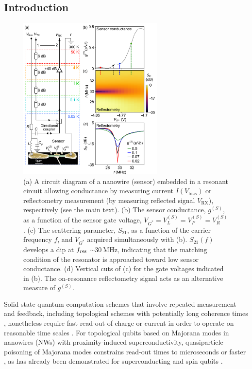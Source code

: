 \subsection{Introduction}

\begin{figure}
	\includegraphics[width=0.65\textwidth]{Fig1-20.pdf}
	\caption[The rf charge-sensing setup]{(a) A circuit diagram of a nanowire (sensor) embedded in a resonant circuit allowing conductance by measuring current $I(V_\textrm{bias})$ or reflectometry measurement (by measuring reflected signal $V_\textrm{RX}$), respectively (see the main text). (b) The sensor conductance, $g^{(S)}$, as a function of the sensor gate voltage, $V_{G^{*}} = V_{L}^{(S)} = V_{P}^{(S)} = V_{R}^{(S)}$. (c) The scattering parameter, $S_{21}$, as a function of the carrier frequency $f$, and $V_{G^{*}}$ acquired simultaneously with (b). $S_{21}(f)$ develops a dip at $f_{\rm res}$ $\sim \SI{30}{\mega\hertz}$, indicating that the matching condition of the resonator is approached toward low sensor conductance. (d) Vertical cuts of (c) for the gate voltages indicated in (b). The on-resonance reflectometry signal acts as an alternative measure of $g^{(S)}$.}
	\label{fig:majo_a}
\end{figure}

Solid-state quantum computation schemes that involve repeated measurement and feedback, including topological schemes \cite{AasenPRX16, PhysRevB.94.235446, Plugge, PhysRevB.95.235305} with potentially long coherence times \cite{Non-Abelian, Alicea_2012}, nonetheless require fast read-out of charge or current in order to operate on reasonable time scales \cite{Reiher7555}. For topological qubits based on Majorana modes in nanowires (NWs) with proximity-induced superconductivity, quasiparticle poisoning of Majorana modes constrains read-out times to microseconds or faster \cite{Lossqpp}, as has already been demonstrated for superconducting \cite{SCq3,SCq2,SCq1,SCq4} and spin qubits \cite{Reilley1,sensingdot,petta,RevModPhys.79.1217}.

